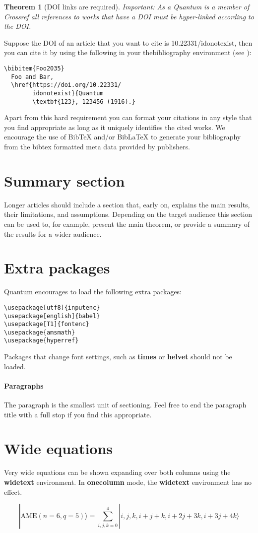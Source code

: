 \documentclass[prx,a4paper,aps,twocolumn,superscriptaddress,11pt]{quantumarticle}
\newtheorem{theorem}{Theorem}
\begin{document}
\begin{theorem}[DOI links are required]
  Important: As a Quantum is a member of Crossref all references to works that have a DOI must be hyper-linked according to the DOI.
\end{theorem}
Suppose the DOI of an article that you want to cite is 10.22331/idonotexist, then you can cite it by using the following in your thebibliography environment (see \cite{Foo2035}):
\begin{verbatim}
\bibitem{Foo2035}
  Foo and Bar,
  \href{https://doi.org/10.22331/
        idonotexist}{Quantum
        \textbf{123}, 123456 (1916).}
\end{verbatim}
Apart from this hard requirement you can format your citations in any style that you find appropriate as long as it uniquely identifies the cited works.
We encourage the use of BibTeX and/or BibLaTeX to generate your bibliography from the bibtex formatted meta data provided by publishers.

\section{Summary section}
Longer articles should include a section that, early on, explains the main results, their limitations, and assumptions.
Depending on the target audience this section can be used to, for example, present the main theorem, or provide a summary of the results for a wider audience.

\section{Extra packages}
Quantum encourages to load the following extra packages:
\begin{verbatim}
\usepackage[utf8]{inputenc}
\usepackage[english]{babel}
\usepackage[T1]{fontenc}
\usepackage{amsmath}
\usepackage{hyperref}
\end{verbatim}
Packages that change font settings, such as \textbf{times} or \textbf{helvet} should not be loaded.

\paragraph{Paragraphs}
The paragraph is the smallest unit of sectioning.
Feel free to end the paragraph title with a full stop if you find this appropriate.

\section{Wide equations}
Very wide equations can be shown expanding over both columns using the \textbf{widetext} environment.
In \textbf{onecolumn} mode, the \textbf{widetext} environment has no effect.
\begin{widetext}
  \begin{equation}
|\mathrm{AME}(n=6,q=5)\rangle=\sum_{i,j,k=0}^4 |i,j,k,i+j+k,i+2j+3k,i+3j+4k\rangle
  \end{equation}
\end{widetext}
\end{document}
